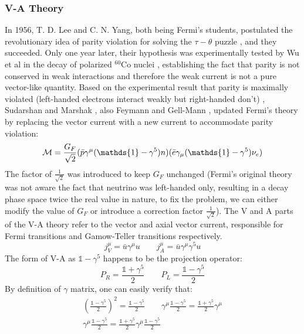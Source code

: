 \subsubsection{V-A Theory}
In 1956, T. D. Lee and C. N. Yang, both being Fermi's students, postulated the
revolutionary idea of parity violation for solving the $\tau-\theta$ puzzle \cite{PhysRev.105.1671}, 
and they succeeded. Only one year later, their hypothesis was experimentally tested
by Wu et al in the decay of polarized ${}^{60}$Co nuclei \cite{PhysRev.105.1413}, 
establishing the fact that parity is not conserved in weak interactions and 
therefore the weak current is not a pure vector-like quantity. 
Based on the experimental result that parity is maximally violated (left-handed 
electrons interact weakly but right-handed don't) \cite{PhysRev.109.1015}, 
Sudarshan and Marshak \cite{PhysRev.109.1860.2}, also Feymann and Gell-Mann \cite{PhysRev.109.193},
updated Fermi's theory by replacing the vector current with a new current to 
accommodate parity violation:
\begin{equation}
    \CM = \frac{G_F}{\sqrt{2}}(\bar{p} \gamma^\mu(\mathds{1} - \gamma^5) n) (\bar{e} \gamma_\mu(\mathds{1} - \gamma^5) \nu_e)
\end{equation}
The factor of $\frac{1}{\sqrt{2}}$ was introduced to keep $G_F$ unchanged (Fermi's
original theory was not aware the fact that neutrino was left-handed only, resulting
in a decay phase space twice the real value in nature, to fix the problem, we can
either modify the value of $G_F$ or introduce a correction factor $\frac{1}{\sqrt{2}}$).
The V and A parts of the V-A theory refer to the vector and axial vector current, 
responsible for Fermi transitions and Gamow-Teller transitions respectively.
\begin{equation}
    j_V^\mu = \bar{u}\gamma^\mu u   \qquad 
    j_A^\mu = \bar{u}\gamma^\mu\gamma^5 u   
\end{equation}
The form of V-A as $\mathds{1} - \gamma^5$ happens to be the projection operator:
\begin{equation}
    P_R = \frac{\mathds{1} + \gamma^5}{2}   \qquad P_L = \frac{\mathds{1} - \gamma^5}{2}
\end{equation}
By definition of $\gamma$ matrix, one can easily verify that:
\begin{equation}
    \begin{gathered}
	\left(\frac{\mathds{1} - \gamma^5}{2} \right)^2 = \frac{\mathds{1} - \gamma^5}{2} 
	\qquad 
	\gamma^\mu \frac{\mathds{1} - \gamma^5}{2} = \frac{\mathds{1} + \gamma^5}{2} \gamma^\mu \\
	\gamma^\mu \frac{\mathds{1} - \gamma^5}{2} = \frac{\mathds{1} + \gamma^5}{2} \gamma^\mu \frac{\mathds{1}-\gamma^5}{2}
    \end{gathered}
\end{equation}
